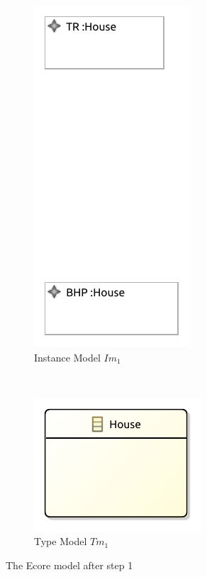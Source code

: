 \begin{figure}[p]
    \centering
    \begin{subfigure}{0.98\textwidth}
        \centering
        \includegraphics{images/06_application/instance_model/step01.pdf}
        \caption{Instance Model $Im_1$}
        \label{fig:application:building_the_model:houses:ecore:instance_model}
    \end{subfigure}
    \\
    \begin{subfigure}{0.98\textwidth}
        \centering
        \includegraphics{images/06_application/type_model/step01.pdf}
        \caption{Type Model $Tm_1$}
        \label{fig:application:building_the_model:houses:ecore:type_model}
    \end{subfigure}
    \caption{The Ecore model after step 1}
    \label{fig:application:building_the_model:houses:ecore}
\end{figure}

